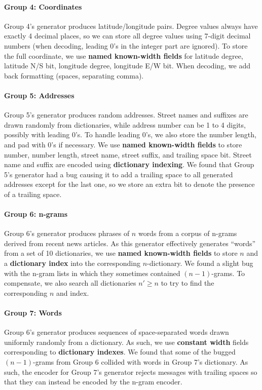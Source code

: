 \documentclass{article}
\begin{document}
\paragraph{Group 4: Coordinates} Group 4's generator produces latitude/longitude pairs. Degree values always have exactly 4 decimal places, so we can store all degree values using 7-digit decimal numbers (when decoding, leading 0's in the integer part are ignored). To store the full coordinate, we use \textbf{named known-width fields} for latitude degree, latitude N/S bit, longitude degree, longitude E/W bit. When decoding, we add back formatting (spaces, separating comma).

\paragraph{Group 5: Addresses} Group 5's generator produces random addresses. Street names and suffixes are drawn randomly from dictionaries, while address number can be 1 to 4 digits, possibly with leading 0's. To handle leading 0's, we also store the number length, and pad with 0's if necessary. We use \textbf{named known-width fields} to store number, number length, street name, street suffix, and trailing space bit. Street name and suffix are encoded using \textbf{dictionary indexing}. We found that Group 5's generator had a bug causing it to add a trailing space to all generated addresses except for the last one, so we store an extra bit to denote the presence of a trailing space.

\paragraph{Group 6: n-grams} Group 6's generator produces phrases of $n$ words from a corpus of n-grams derived from recent news articles. As this generator effectively generates ``words'' from a set of 10 dictionaries, we use \textbf{named known-width fields} to store $n$ and a \textbf{dictionary index} into the corresponding $n$-dictionary. We found a slight bug with the n-gram lists in which they sometimes contained $(n-1)$-grams. To compensate, we also search all dictionaries $n' \ge n$ to try to find the corresponding $n$ and index.

\paragraph{Group 7: Words} Group 6's generator produces sequences of space-separated words drawn uniformly randomly from a dictionary. As such, we use \textbf{constant width} fields corresponding to \textbf{dictionary indexes}. We found that some of the bugged $(n-1)$-grams from Group 6 collided with words in Group 7's dictionary. As such, the encoder for Group 7's generator rejects messages with trailing spaces so that they can instead be encoded by the n-gram encoder.
\end{document}
